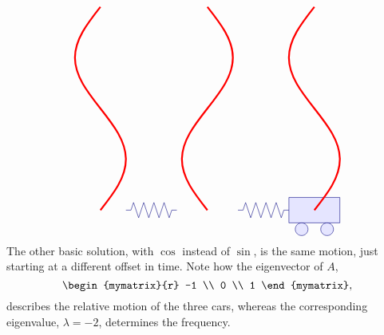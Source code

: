 \begin{solution}
\begin{itemize}
\begin{equation*}
\begin{tikzpicture}[scale=0.8, color=blue!50!black]
\begin{scope}[yshift=-8cm]
          \begin{scope}[xshift=8.4cm]
            \draw[fill=blue!10] (2,0.5) rectangle (4,1.5);
            \draw[fill=blue!10] (2.5,0.25) circle (0.25);
            \draw[fill=blue!10] (3.5,0.25) circle (0.25);
          \end{scope}
          \begin{scope}[xshift=4cm]
            \draw (0,1) -- ++(0.2,0) -- ++(0.1,0.3)
            -- ++(0.2,-0.6) -- ++(0.2,0.6)
            -- ++(0.2,-0.6) -- ++(0.2,0.6)
            -- ++(0.2,-0.6) -- ++(0.2,0.6)
            -- ++(0.2,-0.6) -- ++(0.1,0.3)
            -- ++(0.2,0);
          \end{scope}
          \begin{scope}[xshift=8.4cm]
            \draw (0,1) -- ++(0.2,0) -- ++(0.1,0.3)
            -- ++(0.2,-0.6) -- ++(0.2,0.6)
            -- ++(0.2,-0.6) -- ++(0.2,0.6)
            -- ++(0.2,-0.6) -- ++(0.2,0.6)
            -- ++(0.2,-0.6) -- ++(0.1,0.3)
            -- ++(0.2,0);
          \end{scope}
        \end{scope}
        \begin{scope}[xshift=3cm,yshift=1cm,rotate=-90]
          \draw[ultra thick,red] (0,0) sin (2,-1) cos (4,0) sin (6,1) cos (8,0);
        \end{scope}
        \begin{scope}[xshift=7.2cm,yshift=1cm,rotate=-90]
          \draw[ultra thick,red] (0,0) sin (2,1) cos (4,0) sin (6,-1) cos (8,0);
        \end{scope}
        \begin{scope}[xshift=11.4cm,yshift=1cm,rotate=-90]
          \draw[ultra thick,red] (0,0) sin (2,-1) cos (4,0) sin (6,1) cos (8,0);
        \end{scope}
      \end{tikzpicture}
    \end{equation*}
    The other basic solution, with $\cos$ instead of $\sin$, is the
    same motion, just starting at a different offset in time. Note how
    the eigenvector of $A$,
    \begin{equation*}
      \begin{mymatrix}{r} -1 \\ 0 \\ 1 \end{mymatrix},
    \end{equation*}
    describes the relative motion of the three cars, whereas the
    corresponding eigenvalue, $\lambda=-2$, determines the frequency.
    
  \end{itemize}
\end{solution}

